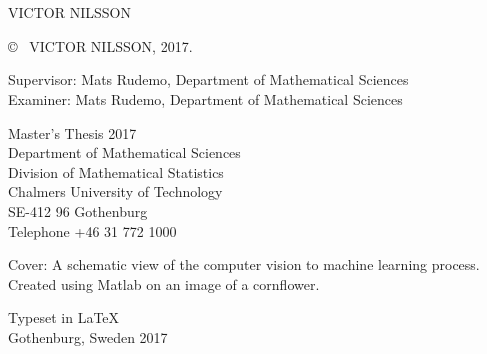 \newpage
\thispagestyle{plain}
\vspace*{4.5cm}
\titlename\\
\subtitlename\\
VICTOR NILSSON \setlength{\parskip}{1cm}

\copyright ~ VICTOR NILSSON, 2017. \setlength{\parskip}{1cm}

Supervisor: Mats Rudemo, Department of Mathematical Sciences\\
Examiner: Mats Rudemo, Department of Mathematical Sciences\\
 \setlength{\parskip}{1cm}

Master's Thesis 2017\\	%
Department of Mathematical Sciences\\
Division of Mathematical Statistics\\
Chalmers University of Technology\\
SE-412 96 Gothenburg\\
Telephone +46 31 772 1000 \setlength{\parskip}{0.5cm}

\vfill
Cover: A schematic view of the computer vision to machine learning process. Created using Matlab on an image of a cornflower. %

Typeset in \LaTeX \\
Gothenburg, Sweden 2017
